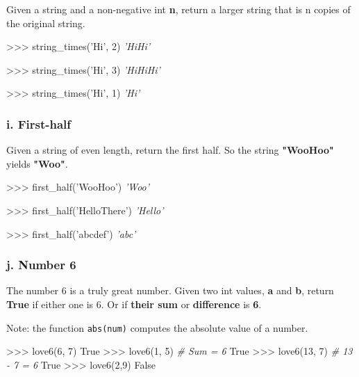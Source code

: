 \documentclass[11pt]{article}
\newenvironment{Shaded}{}{}
\newcommand{\DecValTok}[1]{\textcolor[rgb]{0.25,0.63,0.44}{{#1}}}
\newcommand{\StringTok}[1]{\textcolor[rgb]{0.25,0.44,0.63}{{#1}}}
\newcommand{\CommentTok}[1]{\textcolor[rgb]{0.38,0.63,0.69}{\textit{{#1}}}}
\newcommand{\NormalTok}[1]{{#1}}
\newcommand{\VariableTok}[1]{\textcolor[rgb]{0.10,0.09,0.49}{{#1}}}
\newcommand{\OperatorTok}[1]{\textcolor[rgb]{0.40,0.40,0.40}{{#1}}}
\begin{document}
Given a string and a non-negative int \textbf{n}, return a larger string
that is n copies of the original string.

\begin{Shaded}
\begin{Highlighting}[]
\OperatorTok{>>>}\NormalTok{ string_times(}\StringTok{'Hi'}\NormalTok{, }\DecValTok{2}\NormalTok{)}
    \CommentTok{'HiHi'}
    
\OperatorTok{>>>}\NormalTok{ string_times(}\StringTok{'Hi'}\NormalTok{, }\DecValTok{3}\NormalTok{)}
    \CommentTok{'HiHiHi'}
    
\OperatorTok{>>>}\NormalTok{ string_times(}\StringTok{'Hi'}\NormalTok{, }\DecValTok{1}\NormalTok{)}
    \CommentTok{'Hi'}
\end{Highlighting}
\end{Shaded}

\subsubsection{i. First-half}\label{i.-first-half}

Given a string of even length, return the first half. So the string
\textbf{"WooHoo"} yields \textbf{"Woo"}.

\begin{Shaded}
\begin{Highlighting}[]
\OperatorTok{>>>}\NormalTok{ first_half(}\StringTok{'WooHoo'}\NormalTok{)}
    \CommentTok{'Woo'}
    
\OperatorTok{>>>}\NormalTok{ first_half(}\StringTok{'HelloThere'}\NormalTok{)}
    \CommentTok{'Hello'}
    
\OperatorTok{>>>}\NormalTok{ first_half(}\StringTok{'abcdef'}\NormalTok{)}
    \CommentTok{'abc'}
\end{Highlighting}
\end{Shaded}

\subsubsection{j. Number 6}\label{j.-number-6}

The number 6 is a truly great number. Given two int values, \textbf{a}
and \textbf{b}, return \textbf{True} if either one is 6. Or if
\textbf{their sum} or \textbf{difference} is \textbf{6}.

Note: the function \texttt{abs(num)} computes the absolute value of a
number.

\begin{Shaded}
\begin{Highlighting}[]
\OperatorTok{>>>}\NormalTok{ love6(}\DecValTok{6}\NormalTok{, }\DecValTok{7}\NormalTok{)}
    \VariableTok{True}
\OperatorTok{>>>}\NormalTok{ love6(}\DecValTok{1}\NormalTok{, }\DecValTok{5}\NormalTok{) }\CommentTok{# Sum = 6}
    \VariableTok{True}
\OperatorTok{>>>}\NormalTok{ love6(}\DecValTok{13}\NormalTok{, }\DecValTok{7}\NormalTok{) }\CommentTok{# 13 - 7 = 6}
    \VariableTok{True}
\OperatorTok{>>>}\NormalTok{ love6(}\DecValTok{2}\NormalTok{,}\DecValTok{9}\NormalTok{)}
    \VariableTok{False}
\end{Highlighting}
\end{Shaded}
\end{document}
